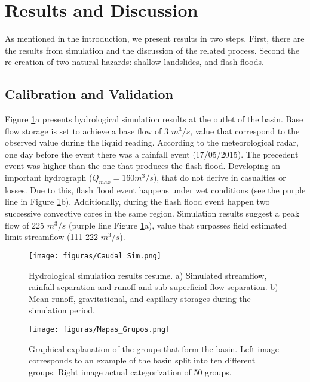 {\section{Results and Discussion}

As mentioned in the introduction, we present results in two steps.  First, there are the results from simulation and the discussion of the related process. Second the re-creation of two natural hazards: shallow landslides, and flash floods.\\

\subsection{Calibration and Validation}

Figure \ref{fig:SimStreamflow}a presents hydrological simulation results at the outlet of the basin.  Base flow storage is set to achieve a base flow of 3 $m^3/s$, value that correspond to the observed value during the liquid reading.  According to the meteorological radar, one day before the event there was a rainfall event (17/05/2015).   The precedent event was higher than the one that produces the flash flood.   Developing an important hydrograph ($Q_{max} = 160 m^3/s$), that do not derive in casualties or losses.  Due to this, flash flood event happens under wet conditions (see the purple line in Figure \ref{fig:SimStreamflow}b).  Additionally, during the flash flood event happen two successive convective cores in the same region.   Simulation results suggest a peak flow of 225 $m^3/s$ (purple line Figure \ref{fig:SimStreamflow}a), value that surpasses field estimated limit streamflow (111-222 $m^3/s$).\\

\begin{figure}[t]
\centering
 \texttt{[image: figuras/Caudal\_Sim.png]}
 \caption{Hydrological simulation results resume. a) Simulated streamflow, rainfall separation and runoff and sub-superficial flow separation. b) Mean runoff, gravitational, and capillary storages during the simulation period.}
    \label{fig:SimStreamflow}
\end{figure}

\begin{figure}[t]
\centering
 \texttt{[image: figuras/Mapas\_Grupos.png]}
 \caption{Graphical explanation of the groups that form the basin. Left image corresponds to an example of the basin split into ten different groups. Right image actual categorization of 50 groups.}
    \label{fig:ExplainationGroups}
\end{figure}

}

